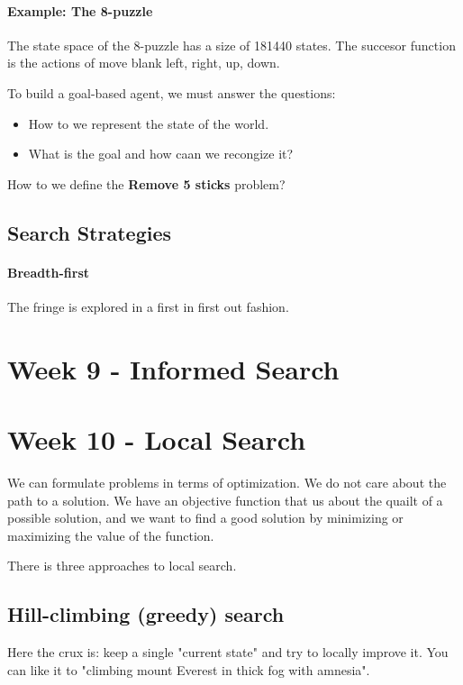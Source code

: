\documentclass{article}
\begin{document}
\paragraph{Example: The 8-puzzle}
The state space of the 8-puzzle has a size of 181440 states. The succesor
function is the actions of move blank left, right, up, down.


To build a goal-based agent, we must answer the questions:
\begin{itemize}
  \item How to we represent the state of the world.
  \item What is the goal and how caan we recongize it?
\end{itemize}

How to we define the \textbf{Remove 5 sticks} problem?

\subsection{Search Strategies}

\paragraph{Breadth-first}
The fringe is explored in a first in first out fashion. 



\newpage


\section{Week 9 - Informed Search}%
\label{sec:1_march_informed_search}

\newpage
\section{Week 10 - Local Search}
We can formulate problems in terms of optimization. We do not care about the
path to a solution. We have an objective function that us about the quailt of a
possible solution, and we want to find a good solution by minimizing or
maximizing the value of the function.

There is three approaches to local search.

\subsection{Hill-climbing (greedy) search}
Here the crux is: keep a single "current state" and try to locally improve it.
You can like it to "climbing mount Everest in thick fog with amnesia".
\end{document}

